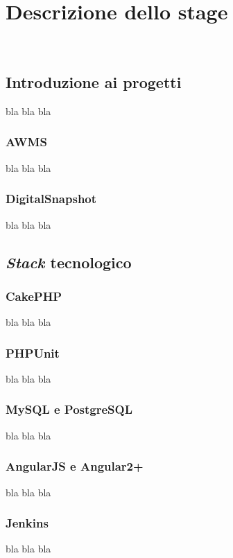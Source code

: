 
\chapter{Descrizione dello stage}
\label{cap:descrizione-stage}

\\

\section{Introduzione ai progetti}
bla bla bla
\subsection{AWMS}
bla bla bla
\subsection{DigitalSnapshot}
bla bla bla
\section{\textit{Stack} tecnologico}
\subsection{CakePHP}
bla bla bla
\subsection{PHPUnit}
bla bla bla
\subsection{MySQL e PostgreSQL}
bla bla bla
\subsection{AngularJS e Angular2+}
bla bla bla
\subsection{Jenkins}
bla bla bla

